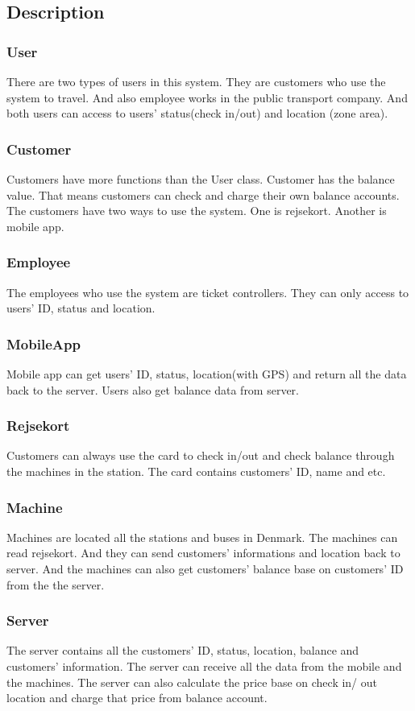 \subsection*{Description}

\subsubsection{User}
There are two types of users in this system. They are customers who use the system to travel. And also employee works in the public transport company. And both users can access to users’ status(check in/out) and location (zone area).

\subsubsection{Customer}
Customers have more functions than the User class. Customer has the balance value. That means customers can check and charge their own balance accounts. The customers have two ways to use the system. One is rejsekort. Another is mobile app.

\subsubsection{Employee}
The employees who use the system are ticket controllers. They can only access to users’ ID, status and location.

\subsubsection{MobileApp}
Mobile app can get users’ ID, status, location(with GPS) and return all the data back to the server. Users also get balance data from server.

\subsubsection{Rejsekort}
Customers can always use the card to check in/out and check balance through the machines in the station. The card contains customers’ ID, name and etc.

\subsubsection{Machine}
Machines are located all the stations and buses in Denmark. The machines can read rejsekort. And they can send customers’ informations and location back to server. And the machines can also get customers’ balance base on customers’ ID from the the server.

\subsubsection{Server}
The server contains all the customers’ ID, status, location, balance and customers’ information. The server can receive all the data from the mobile and the machines. The server can also calculate the price base on check in/ out location and charge that price from balance account. 